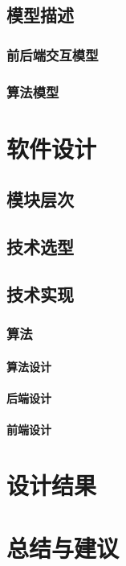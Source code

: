 \documentclass[a4paper]{article}
\begin{document}
\subsection{模型描述}
\subsubsection{前后端交互模型}
\subsubsection{算法模型}

\sectionbreak
\section{软件设计}
\subsection{模块层次}
\subsection{技术选型}
\subsection{技术实现}
\subsubsection{算法}
\paragraph{算法设计}
\paragraph{后端设计}
\paragraph{前端设计}

\sectionbreak
\section{设计结果}

\sectionbreak
\section{总结与建议}
\end{document}
